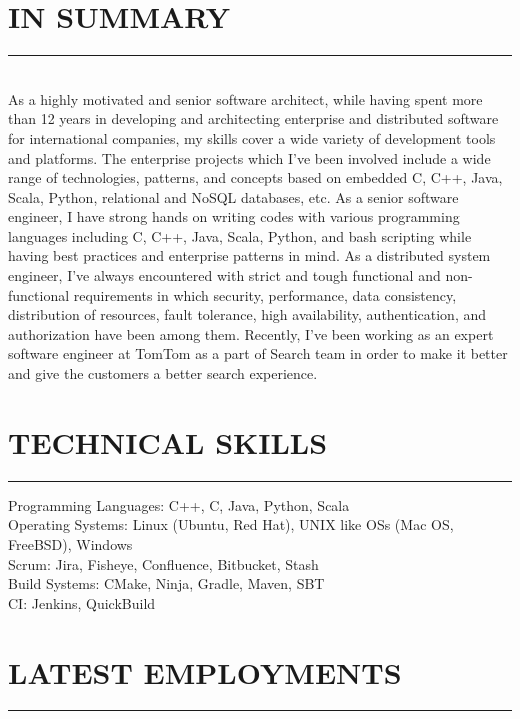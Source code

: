 \documentclass[10pt,a4paper]{article}
\begin{document}
\thispagestyle{fancy}

\hfill \break
\section{IN SUMMARY}
\noindent \rule {3.4cm}{0.4pt} \\
As a highly motivated and senior software architect, while having spent more than 12 years in developing and architecting enterprise and distributed software for international companies, my skills cover a wide variety of development tools and platforms. The enterprise projects which I've been involved include a wide range of technologies, patterns, and concepts based on embedded C, C++, Java, Scala, Python, relational and NoSQL databases, etc. As a senior software engineer, I have strong hands on writing codes with various programming languages including C, C++, Java, Scala, Python, and bash scripting while having best practices and enterprise patterns in mind. As a distributed system engineer, I've always encountered with strict and tough functional and non-functional requirements in which security, performance, data consistency, distribution of resources, fault tolerance, high availability, authentication, and authorization have been among them. Recently, I've been working as an expert software engineer at TomTom as a part of Search team in order to make it better and give the customers a better search experience.

\section{TECHNICAL SKILLS}
\noindent \rule {3.5cm}{0.4pt}

Programming Languages: C++, C, Java, Python, Scala \\
Operating Systems: Linux (Ubuntu, Red Hat), UNIX like OSs (Mac OS, FreeBSD), Windows \\
Scrum: Jira, Fisheye, Confluence, Bitbucket, Stash \\
Build Systems: CMake, Ninja, Gradle, Maven, SBT \\
CI: Jenkins, QuickBuild

\section{LATEST EMPLOYMENTS}
\noindent \rule {3.7cm}{0.4pt}
\end{document}
